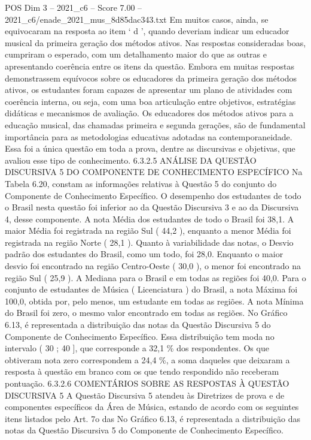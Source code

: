 \begin{textsample}{POS Dim 3 – 2021\_c6 – Score 7.00 – 2021\_c6/enade\_2021\_mus\_8d85dac343.txt}
Em muitos casos, ainda, se equivocaram na resposta ao item ‘ d ’, quando deveriam indicar um educador musical da primeira geração dos métodos ativos.
Nas respostas consideradas boas, cumpriram o esperado, com um detalhamento maior do que as outras e apresentando coerência entre os itens da questão.
Embora em muitas respostas demonstrassem equívocos sobre os educadores da primeira geração dos métodos ativos, os estudantes foram capazes de apresentar um plano de atividades com coerência interna, ou seja, com uma boa articulação entre objetivos, estratégias didáticas e mecanismos de avaliação.
Os educadores dos métodos ativos para a educação musical, das chamadas primeira e segunda gerações, são de fundamental importância para as metodologias educativas adotadas na contemporaneidade.
Essa foi a única questão em toda a prova, dentre as discursivas e objetivas, que avaliou esse tipo de conhecimento. 6.3.2.5 ANÁLISE DA QUESTÃO DISCURSIVA 5 DO COMPONENTE DE CONHECIMENTO ESPECÍFICO Na Tabela 6.20, constam as informações relativas à Questão 5 do conjunto do Componente de Conhecimento Específico.
O desempenho dos estudantes de todo o Brasil nesta questão foi inferior ao da Questão Discursiva 3 e ao da Discursiva 4, desse componente.
A nota Média dos estudantes de todo o Brasil foi 38,1.
A maior Média foi registrada na região Sul ( 44,2 ), enquanto a menor Média foi registrada na região Norte ( 28,1 ).
Quanto à variabilidade das notas, o Desvio padrão dos estudantes do Brasil, como um todo, foi 28,0.
Enquanto o maior desvio foi encontrado na região Centro-Oeste ( 30,0 ), o menor foi encontrado na região Sul ( 25,9 ).
A Mediana para o Brasil e em todas as regiões foi 40,0.
Para o conjunto de estudantes de Música ( Licenciatura ) do Brasil, a nota Máxima foi 100,0, obtida por, pelo menos, um estudante em todas as regiões.
A nota Mínima do Brasil foi zero, o mesmo valor encontrado em todas as regiões.
No Gráfico 6.13, é representada a distribuição das notas da Questão Discursiva 5 do Componente de Conhecimento Específico.
Essa distribuição tem moda no intervalo ( 30 ; 40 ], que corresponde a 32,1 \% dos respondentes.
Os que obtiveram nota zero correspondem a 24,4 \%, a soma daqueles que deixaram a resposta à questão em branco com os que tendo respondido não receberam pontuação. 6.3.2.6 COMENTÁRIOS SOBRE AS RESPOSTAS À QUESTÃO DISCURSIVA 5 A Questão Discursiva 5 atendeu às Diretrizes de prova e de componentes específicos da Área de Música, estando de acordo com os seguintes itens listados pelo Art. 7o das No Gráfico 6.13, é representada a distribuição das notas da Questão Discursiva 5 do Componente de Conhecimento Específico.

\end{textsample}
